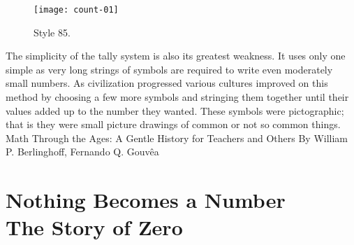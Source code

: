 \begin{figure}[ht]
\centering
\texttt{[image: count-01]}
\caption*{Style 85.}
\end{figure}

The simplicity of the tally system is also its greatest weakness. It uses only one simple as very long strings of symbols are required to write even moderately small numbers. As civilization progressed various cultures improved on this
method by choosing a few more symbols and stringing them together until their values added up to the number they wanted. These symbols were pictographic; that is they were small picture drawings of common or not so common things. 
Math Through the Ages: A Gentle History for Teachers and Others
 By William P. Berlinghoff, Fernando Q. Gouvêa

\lipsum[1-3] 


\chapter{Nothing Becomes a Number\\ The Story of Zero\\ }

%

